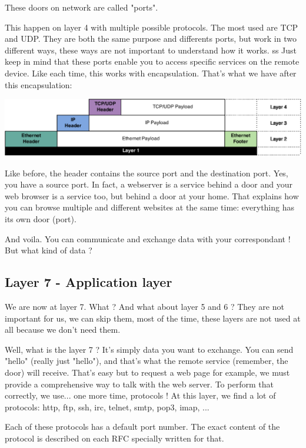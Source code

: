\documentclass{article}
\begin{document}
	These doors on network are called "ports".
	
	This happen on layer 4 with multiple possible protocols. The most used are TCP and UDP. They are both the same purpose
	and differents ports, but work in two different ways, these ways are not important to understand how it works.
	ss
	Just keep in mind that these ports enable you to access specific services on the remote device. Like each time,
	this works with encapsulation. That's what we have after this encapsulation:
	\begin{center}
	\includegraphics[scale=0.3]{content/layer4.eps}
	\end{center}
	
	Like before, the header contains the source port and the destination port. Yes, you have a source port. In fact,
	a webserver is a service behind a door and your web browser is a service too, but behind a door at your home.
	That explains how you can browse multiple and different websites at the same time: everything has its own door (port).
	
	And voila. You can communicate and exchange data with your correspondant ! But what kind of data ?
	
	\subsection{Layer 7 - Application layer}
	
	We are now at layer 7. What ? And what about layer 5 and 6 ? They are not important for us, we can skip them, most
	of the time, these layers are not used at all because we don't need them.
	
	Well, what is the layer 7 ? It's simply data you want to exchange. You can send "hello" (really just "hello"),
	and that's what the remote service (remember, the door) will receive. That's easy but to request a web page for example,
	we must provide a comprehensive way to talk with the web server. To perform that correctly, we use... one more time,
	protocols ! At this layer, we find a lot of protocols: http, ftp, ssh, irc, telnet, smtp, pop3, imap, ...
	
	Each of these protocols has a default port number. The exact content of the protocol is described on each RFC
	specially written for that.
	
\end{document}
